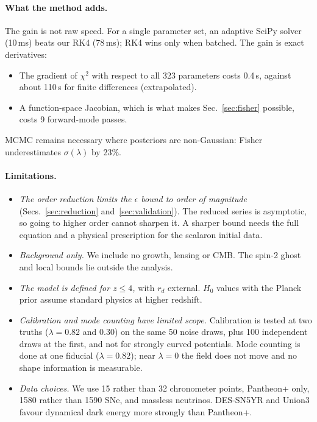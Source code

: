 \documentclass[11pt,a4paper]{article}
\begin{document}
\paragraph{What the method adds.} The gain is not raw speed. For a single parameter set, an adaptive SciPy solver (10\,ms) beats our RK4 (78\,ms); RK4 wins only when batched. The gain is exact derivatives:
\begin{itemize}
\item The gradient of $\chi^2$ with respect to all 323 parameters costs 0.4\,s, against about 110\,s for finite differences (extrapolated).
\item A function-space Jacobian, which is what makes Sec.~\ref{sec:fisher} possible, costs 9 forward-mode passes.
\end{itemize}
MCMC remains necessary where posteriors are non-Gaussian: Fisher underestimates $\sigma(\lambda)$ by 23\%.

\paragraph{Limitations.}
\begin{itemize}
\item \emph{The order reduction limits the $\epsilon$ bound to order of magnitude} (Secs.~\ref{sec:reduction} and~\ref{sec:validation}). The reduced series is asymptotic, so going to higher order cannot sharpen it. A sharper bound needs the full equation and a physical prescription for the scalaron initial data.
\item \emph{Background only.} We include no growth, lensing or CMB. The spin-2 ghost and local bounds lie outside the analysis.
\item \emph{The model is defined for $z\le4$,} with $r_d$ external. $H_0$ values with the Planck prior assume standard physics at higher redshift.
\item \emph{Calibration and mode counting have limited scope.} Calibration is tested at two truths ($\lambda=0.82$ and $0.30$) on the same 50 noise draws, plus 100 independent draws at the first, and not for strongly curved potentials. Mode counting is done at one fiducial ($\lambda=0.82$); near $\lambda=0$ the field does not move and no shape information is measurable.
\item \emph{Data choices.} We use 15 rather than 32 chronometer points, Pantheon+ only, 1580 rather than 1590 SNe, and massless neutrinos. DES-SN5YR and Union3 favour dynamical dark energy more strongly than Pantheon+.
\end{itemize}
\end{document}
